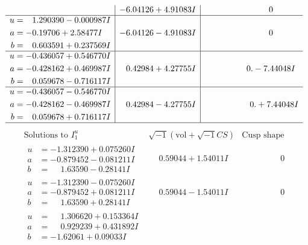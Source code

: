 \documentclass[1p]{elsarticle_modified}
\theoremstyle{definition}
\newcommand{\I}{\sqrt{-1}}
\begin{document}
$$\begin{array}{c|c|c}
 & -6.04126 + 4.91083 I & \phantom{-0.000000 } 0 \\ \hline\begin{aligned}
u &= \phantom{-}1.290390 - 0.000987 I \\
a &= -0.19706 + 2.58477 I \\
b &= \phantom{-}0.603591 + 0.237569 I\end{aligned}
 & -6.04126 - 4.91083 I & \phantom{-0.000000 } 0 \\ \hline\begin{aligned}
u &= -0.436057 + 0.546770 I \\
a &= -0.428162 + 0.469987 I \\
b &= \phantom{-}0.059678 - 0.716117 I\end{aligned}
 & \phantom{-}0.42984 + 4.27755 I & \phantom{-0.000000 } 0. - 7.44048 I \\ \hline\begin{aligned}
u &= -0.436057 - 0.546770 I \\
a &= -0.428162 - 0.469987 I \\
b &= \phantom{-}0.059678 + 0.716117 I\end{aligned}
 & \phantom{-}0.42984 - 4.27755 I & \phantom{-0.000000 -}0. + 7.44048 I\\
 \hline 
 \end{array}$$\newpage$$\begin{array}{c|c|c}  
\text{Solutions to }I^u_{1}& \I (\text{vol} + \sqrt{-1}CS) & \text{Cusp shape}\\
 \hline 
\begin{aligned}
u &= -1.312390 + 0.075260 I \\
a &= -0.879452 - 0.081211 I \\
b &= \phantom{-}1.63590 - 0.28141 I\end{aligned}
 & \phantom{-}0.59044 + 1.54011 I & \phantom{-0.000000 } 0 \\ \hline\begin{aligned}
u &= -1.312390 - 0.075260 I \\
a &= -0.879452 + 0.081211 I \\
b &= \phantom{-}1.63590 + 0.28141 I\end{aligned}
 & \phantom{-}0.59044 - 1.54011 I & \phantom{-0.000000 } 0 \\ \hline\begin{aligned}
u &= \phantom{-}1.306620 + 0.153364 I \\
a &= \phantom{-}0.929239 + 0.431892 I \\
b &= -1.62061 + 0.09033 I\end{aligned}

\end{array}$$
\end{document}
